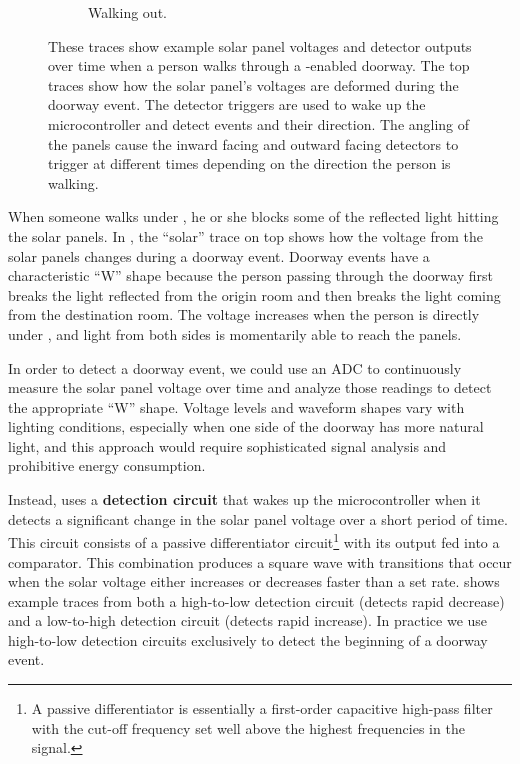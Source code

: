 \begin{figure}[t]
\begin{subfigure}[b]{0.5\textwidth}
		\caption{Walking out.}
		\label{fig:tracesout}
	\end{subfigure}
	\caption{ These traces show example solar panel voltages and detector outputs over time when a person walks through a \sysname-enabled doorway. The top traces show how the solar panel's voltages are deformed during the doorway event. The detector triggers are used to wake up the microcontroller and detect events and their direction. The angling of the panels cause the inward facing and outward facing detectors to trigger at different times depending on the direction the person is walking.\label{fig:traces}}
\end{figure}


When someone walks under \sysname, he or she blocks some of the reflected light hitting the solar panels.
In , the ``solar'' trace on top shows how the voltage from the solar panels changes during a doorway event.
Doorway events have a characteristic ``W'' shape because the person passing through the doorway first breaks the light reflected from the origin room and then breaks the light coming from the destination room.
The voltage increases when the person is directly under \sysname, and light from both sides is momentarily able to reach the panels.


In order to detect a doorway event, we could use an ADC to continuously measure the solar panel voltage over time and analyze those readings to detect the appropriate ``W'' shape.
Voltage levels and waveform shapes vary with lighting conditions, especially when one side of the doorway has more natural light, and this approach would require sophisticated signal analysis and prohibitive energy consumption.

Instead, \sysname uses a \textbf{detection circuit} that wakes up the microcontroller when it detects a significant change in the solar panel voltage over a short period of time.
This circuit consists of a passive differentiator circuit\footnote{A passive differentiator is essentially a first-order capacitive high-pass filter with the cut-off frequency set well above the highest frequencies in the signal.} with its output fed into a comparator.
This combination produces a square wave with transitions that occur when the solar voltage either increases or decreases faster than a set rate.
 shows example traces from both a high-to-low detection circuit (detects rapid decrease) and a low-to-high detection circuit (detects rapid increase).
In practice we use high-to-low detection circuits exclusively to detect the beginning of a doorway event.


